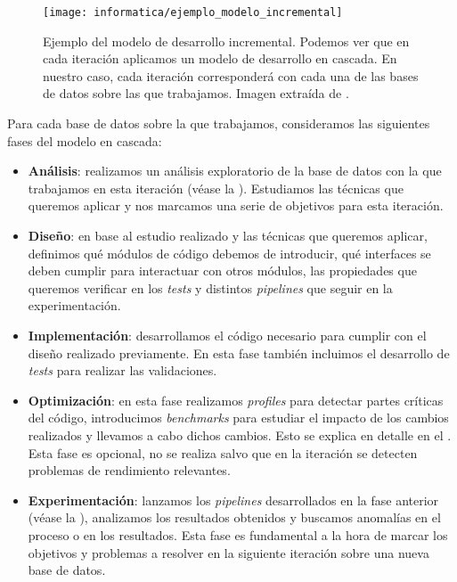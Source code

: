 \begin{figure}[H]
	\centering
	\texttt{[image: informatica/ejemplo\_modelo\_incremental]}
	\caption{Ejemplo del modelo de desarrollo incremental. Podemos ver que en cada iteración aplicamos un modelo de desarrollo en cascada. En nuestro caso, cada iteración corresponderá con cada una de las bases de datos sobre las que trabajamos. Imagen extraída de \cite{informatica:libro_metodologias_desarrollo}.}
\end{figure}

Para cada base de datos sobre la que trabajamos, consideramos las siguientes fases del modelo en cascada:

\begin{itemize}
	\item \textbf{Análisis}: realizamos un análisis exploratorio de la base de datos con la que trabajamos en esta iteración (véase la ). Estudiamos las técnicas que queremos aplicar y nos marcamos una serie de objetivos para esta iteración.
	\item \textbf{Diseño}: en base al estudio realizado y las técnicas que queremos aplicar, definimos qué módulos de código debemos de introducir, qué interfaces se deben cumplir para interactuar con otros módulos, las propiedades que queremos verificar en los \textit{tests} y distintos \textit{pipelines} que seguir en la experimentación.
	\item \textbf{Implementación}: desarrollamos el código necesario para cumplir con el diseño realizado previamente. En esta fase también incluimos el desarrollo de \textit{tests} para realizar las validaciones.
	\item \textbf{Optimización}: en esta fase realizamos \textit{profiles} para detectar partes críticas del código, introducimos \textit{benchmarks} para estudiar el impacto de los cambios realizados y llevamos a cabo dichos cambios. Esto se explica en detalle en el . Esta fase es opcional, no se realiza salvo que en la iteración se detecten problemas de rendimiento relevantes.
	\item \textbf{Experimentación}: lanzamos los \textit{pipelines} desarrollados en la fase anterior (véase la ), analizamos los resultados obtenidos y buscamos anomalías en el proceso o en los resultados. Esta fase es fundamental a la hora de marcar los objetivos y problemas a resolver en la siguiente iteración sobre una nueva base de datos.
\end{itemize}

